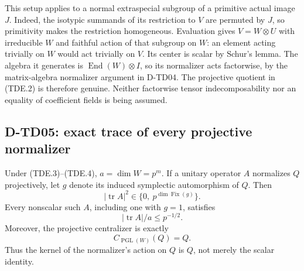 This setup applies to a normal extraspecial subgroup of a primitive
actual image $J$.  Indeed, the isotypic summands of its restriction to
$V$ are permuted by $J$, so primitivity makes the restriction homogeneous.
Evaluation gives $V=W\otimes U$ with irreducible $W$ and faithful action
of that subgroup on $W$: an element acting trivially on $W$ would act
trivially on $V$.  Its center is scalar by Schur's lemma.  The algebra
it generates is $\operatorname{End}(W)\otimes I$, so its normalizer acts
factorwise, by the matrix-algebra normalizer argument in D-TD04.
The projective quotient in (TDE.2) is therefore genuine.  Neither
factorwise tensor indecomposability nor an equality of coefficient
fields is being assumed.

\subsection{D-TD05: exact trace of every projective normalizer}

\begin{theorem}[D-TD05]
Under (TDE.3)--(TDE.4), $a=\dim W=p^m$.  If a unitary operator $A$
normalizes $Q$ projectively, let $g$ denote its induced symplectic
automorphism of $Q$.  Then
\[
        |\operatorname{tr}A|^2\in\{0,\ p^{\dim\operatorname{Fix}(g)}\}.
        \tag{TDE.5}
\]
Every nonscalar such $A$, including one with $g=1$, satisfies
\[
                  |\operatorname{tr}A|/a\le p^{-1/2}.
                  \tag{TDE.6}
\]
Moreover, the projective centralizer is exactly
\[
                   C_{\operatorname{PGL}(W)}(Q)=Q.
                   \tag{TDE.7}
\]
Thus the kernel of the normalizer's action on $Q$ is $Q$, not merely
the scalar identity.
\end{theorem}

